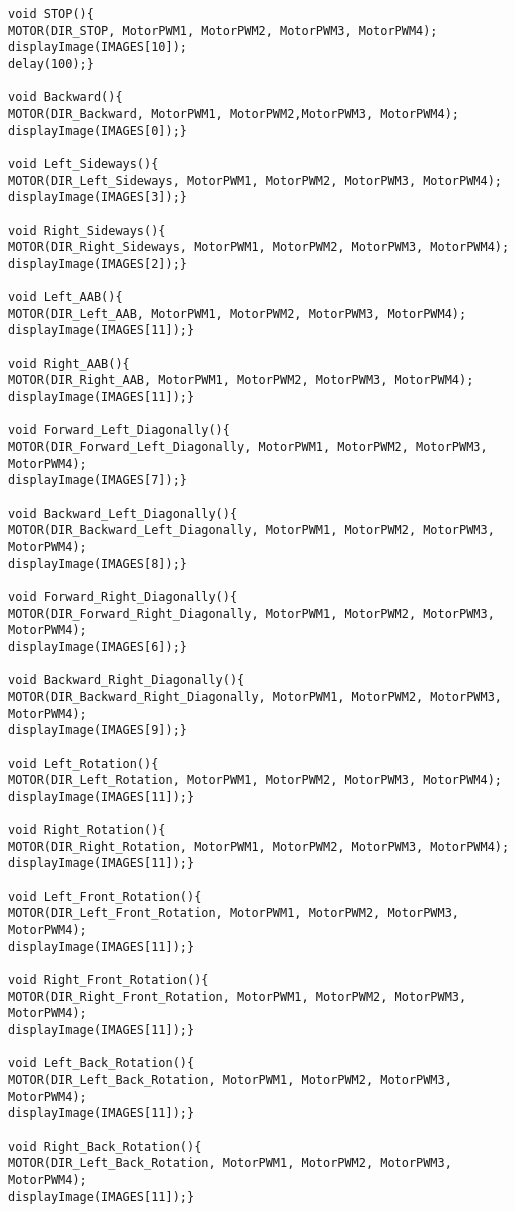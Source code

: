 \begin{lstlisting}
void STOP(){
MOTOR(DIR_STOP, MotorPWM1, MotorPWM2, MotorPWM3, MotorPWM4);
displayImage(IMAGES[10]);
delay(100);}

void Backward(){
MOTOR(DIR_Backward, MotorPWM1, MotorPWM2,MotorPWM3, MotorPWM4);
displayImage(IMAGES[0]);}

void Left_Sideways(){
MOTOR(DIR_Left_Sideways, MotorPWM1, MotorPWM2, MotorPWM3, MotorPWM4);
displayImage(IMAGES[3]);}

void Right_Sideways(){
MOTOR(DIR_Right_Sideways, MotorPWM1, MotorPWM2, MotorPWM3, MotorPWM4);
displayImage(IMAGES[2]);}

void Left_AAB(){
MOTOR(DIR_Left_AAB, MotorPWM1, MotorPWM2, MotorPWM3, MotorPWM4);
displayImage(IMAGES[11]);}

void Right_AAB(){
MOTOR(DIR_Right_AAB, MotorPWM1, MotorPWM2, MotorPWM3, MotorPWM4);
displayImage(IMAGES[11]);}

void Forward_Left_Diagonally(){
MOTOR(DIR_Forward_Left_Diagonally, MotorPWM1, MotorPWM2, MotorPWM3, MotorPWM4);
displayImage(IMAGES[7]);}

void Backward_Left_Diagonally(){
MOTOR(DIR_Backward_Left_Diagonally, MotorPWM1, MotorPWM2, MotorPWM3, MotorPWM4);
displayImage(IMAGES[8]);}

void Forward_Right_Diagonally(){
MOTOR(DIR_Forward_Right_Diagonally, MotorPWM1, MotorPWM2, MotorPWM3, MotorPWM4);
displayImage(IMAGES[6]);}

void Backward_Right_Diagonally(){
MOTOR(DIR_Backward_Right_Diagonally, MotorPWM1, MotorPWM2, MotorPWM3, MotorPWM4);
displayImage(IMAGES[9]);}

void Left_Rotation(){
MOTOR(DIR_Left_Rotation, MotorPWM1, MotorPWM2, MotorPWM3, MotorPWM4);
displayImage(IMAGES[11]);}

void Right_Rotation(){
MOTOR(DIR_Right_Rotation, MotorPWM1, MotorPWM2, MotorPWM3, MotorPWM4);
displayImage(IMAGES[11]);}

void Left_Front_Rotation(){
MOTOR(DIR_Left_Front_Rotation, MotorPWM1, MotorPWM2, MotorPWM3, MotorPWM4);
displayImage(IMAGES[11]);}

void Right_Front_Rotation(){
MOTOR(DIR_Right_Front_Rotation, MotorPWM1, MotorPWM2, MotorPWM3, MotorPWM4);
displayImage(IMAGES[11]);}

void Left_Back_Rotation(){
MOTOR(DIR_Left_Back_Rotation, MotorPWM1, MotorPWM2, MotorPWM3, MotorPWM4);
displayImage(IMAGES[11]);}

void Right_Back_Rotation(){
MOTOR(DIR_Left_Back_Rotation, MotorPWM1, MotorPWM2, MotorPWM3, MotorPWM4);
displayImage(IMAGES[11]);}


\end{lstlisting}

